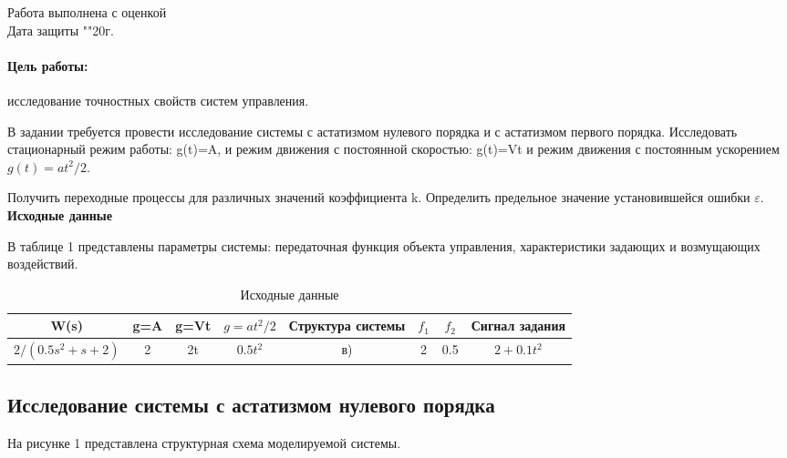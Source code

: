 \documentclass[12pt,a4paper]{article}
\begin{document}
\begin{titlepage}
		Работа выполнена с оценкой \hspace{1cm} \underline{\hspace{8cm}} \\ 
		\vspace{1cm}
		Дата защиты "\underline{\hspace{0.7cm}}"\hspace{0.2cm}\underline{\hspace{2cm}}\hspace{0.2cm}20\underline{\hspace{0.7cm}}г.

	\end{titlepage}


 \par
\paragraph{Цель работы:} исследование точностных свойств систем управления.
\par
В задании требуется провести исследование системы с астатизмом нулевого порядка и с астатизмом первого порядка.
Исследовать стационарный режим работы: g(t)=A, и режим движения с постоянной скоростью: g(t)=Vt и режим движения с постоянным ускорением $g(t)=at^2/2$.
\par 
Получить переходные процессы для различных значений коэффициента k. 
Определить предельное значение установившейся ошибки $\varepsilon$.\\
\textbf{Исходные данные}
\par В таблице 1 представлены  параметры системы: передаточная функция объекта управления, характеристики задающих и возмущающих воздействий. 

\begin{table} [h!]
\centering
\begin{threeparttable}
\caption{Исходные данные}
\begin{tabular}{ |c|c|c|c|c|c|c|c| }
 \hline
  W(s) & g=A & g=Vt &  $g=at^2/2$ & Структура системы & $f_{1}$ & $f_{2}$ & Сигнал задания \\ 
 \hline
  $ 2/(0.5s^2+s+2) $ & 2 & 2t  & $ 0.5t^2 $ & в) & 2 & 0.5 & $2+0.1t^2$ \\ 
 \hline
\end{tabular}
\end{threeparttable}
\end{table}


\newpage
\begin{center}
\section{Исследование системы с астатизмом нулевого порядка}
\end{center}
\par На рисунке 1 представлена структурная схема моделируемой системы.
\end{document}
